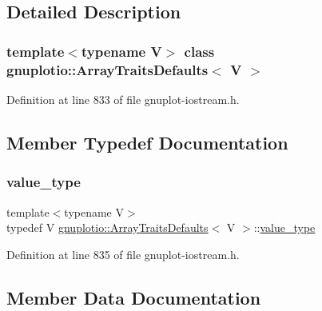 \subsection{Detailed Description}
\subsubsection*{template$<$typename V$>$\newline
class gnuplotio\+::\+Array\+Traits\+Defaults$<$ V $>$}



Definition at line 833 of file gnuplot-\/iostream.\+h.



\subsection{Member Typedef Documentation}
\mbox{\label{classgnuplotio_1_1_array_traits_defaults_ad7a9e8d19419fabe2ab9cc1b76c9965b}} 
\subsubsection{\texorpdfstring{value\+\_\+type}{value\_type}}
{\footnotesize\ttfamily template$<$typename V$>$ \\
typedef V \hyperlink{classgnuplotio_1_1_array_traits_defaults}{gnuplotio\+::\+Array\+Traits\+Defaults}$<$ V $>$\+::\hyperlink{classgnuplotio_1_1_array_traits_defaults_ad7a9e8d19419fabe2ab9cc1b76c9965b}{value\+\_\+type}}



Definition at line 835 of file gnuplot-\/iostream.\+h.



\subsection{Member Data Documentation}
\mbox{\label{classgnuplotio_1_1_array_traits_defaults_ac8d430cba6ceefc6f52706455f12a0e8}} 
